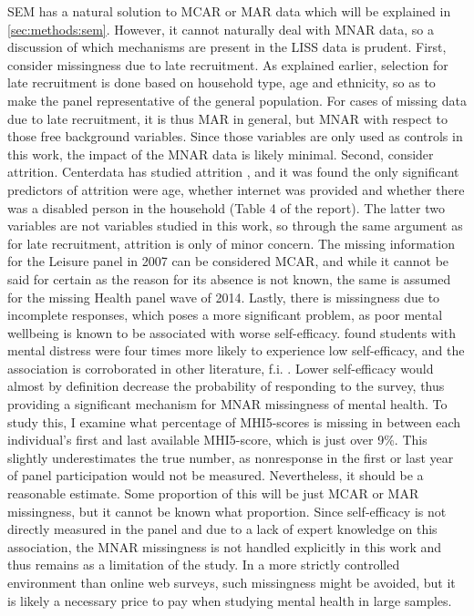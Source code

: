 SEM has a natural solution to MCAR or MAR data which will be explained in \cref{sec:methods:sem}.
However, it cannot naturally deal with MNAR data, so a discussion of which mechanisms are present in the LISS data is prudent.
First, consider missingness due to late recruitment. As explained earlier, selection for late recruitment is done based
on household type, age and ethnicity, so as to make the panel representative of the general population. For cases of missing
data due to late recruitment, it is thus MAR in general, but MNAR with respect to those free background variables.
Since those variables are only used as controls in this work, the impact of the MNAR data is likely minimal.
Second, consider attrition. Centerdata has studied attrition \cite{vos2009attrition}, and it was found the only significant
predictors of attrition were age, whether internet was provided and whether there was a disabled person
in the household (Table 4 of the report). The latter two variables are not variables studied in this work, so through
the same argument as for late recruitment, attrition is only of minor concern.
The missing information for the Leisure panel in 2007 can be considered MCAR, and while it cannot be said for certain as
the reason for its absence is not known, the same is assumed for the missing Health panel wave of 2014.
Lastly, there is missingness due to incomplete responses, which poses a more significant problem, as
poor mental wellbeing is known to be associated with worse self-efficacy.
 found students with mental distress were four times more likely to experience low
self-efficacy, and the association is corroborated in other literature, f.i. .
Lower self-efficacy would almost by definition decrease the probability of responding to the survey, thus providing
a significant mechanism for MNAR missingness of mental health.
To study this, I examine what percentage of MHI5-scores is missing in between each individual's first and last
available MHI5-score, which is just over 9\%. This slightly underestimates the true number, as nonresponse
in the first or last year of panel participation would not be measured. Nevertheless, it should be a reasonable
estimate. Some proportion of this will be just MCAR or MAR missingness, but it cannot be known what proportion.
Since self-efficacy is not directly measured in the panel and due to a lack of expert knowledge on this association,
the MNAR missingness is not handled explicitly in this work and thus remains as a limitation of the study.
In a more strictly controlled environment than online web surveys, such missingness might be avoided, but it is likely
a necessary price to pay when studying mental health in large samples.
